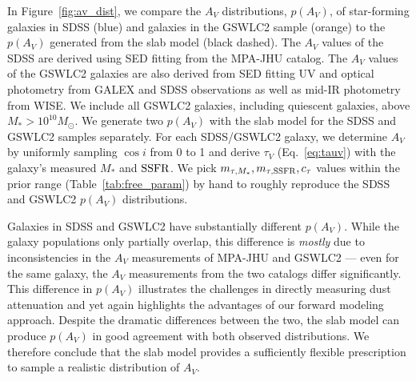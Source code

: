 In Figure~\ref{fig:av_dist}, we compare the $A_V$ distributions, $p(A_V)$,
of star-forming galaxies in SDSS (blue) and galaxies in the
\cite{salim2018} GSWLC2 sample (orange) to the $p(A_V)$ generated from the
slab model (black dashed). 
The $A_V$ values of the SDSS are derived using SED fitting from the
\cite{brinchmann2004} MPA-JHU catalog.
The $A_V$ values of the GSWLC2 galaxies are also derived from SED fitting UV and optical
photometry from GALEX and SDSS observations as well as mid-IR photometry from WISE. 
We include all GSWLC2 galaxies, including quiescent galaxies, above $M_* > 10^{10}M_\odot$. 
We generate two $p(A_V)$ with the slab model for the SDSS and GSWLC2
samples separately.
For each SDSS/GSWLC2 galaxy, we determine $A_V$ by uniformly sampling 
$\cos i$ from 0 to 1 and derive $\tau_V$ (Eq.~\ref{eq:tauv}) with the
galaxy's measured $M_*$ and ${\rm SSFR}$. 
We pick $m_{\tau,M_*}, m_{\tau,{\rm SSFR}}, c_\tau$ values within the prior range
(Table~\ref{tab:free_param}) by hand to roughly reproduce the SDSS and GSWLC2 $p(A_V)$
distributions. 

Galaxies in SDSS and GSWLC2 have substantially different $p(A_V)$. 
While the galaxy populations only partially overlap, this difference is 
{\em mostly} due to inconsistencies in the $A_V$ measurements of MPA-JHU and GSWLC2 --- even
for the same galaxy, the $A_V$ measurements from the two catalogs differ significantly. 
This difference in $p(A_V)$ illustrates the challenges in directly measuring
dust attenuation and yet again highlights the advantages of our forward
modeling approach. 
Despite the dramatic differences between the two, the slab model can
produce $p(A_V)$ in good agreement with both observed distributions. 
We therefore conclude that the slab model provides a sufficiently flexible
prescription to sample a realistic distribution of $A_V$. 

